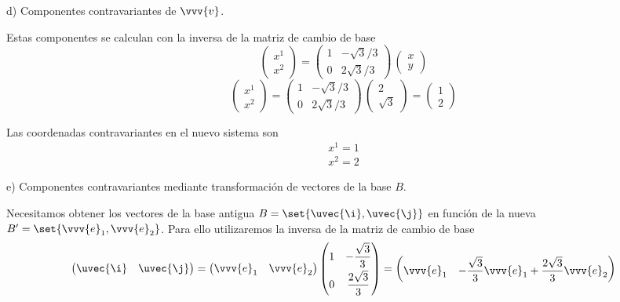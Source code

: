 \noindent
d) Componentes contravariantes de $\vvv{v}$.

Estas componentes se calculan con la inversa de la matriz de cambio de base
\[
  \begin{pmatrix}
    x^1\\
    x^2
  \end{pmatrix}
  = \begin{pmatrix}
    1 & -\sqrt{3}/3\\
    0 & 2\sqrt{3}/3
  \end{pmatrix}
  \,\begin{pmatrix}
    x\\
    y
  \end{pmatrix}
\]
\[
  \begin{pmatrix}
    x^1\\
    x^2
  \end{pmatrix}
  = \begin{pmatrix}
    1 & -\sqrt{3}/3\\
    0 & 2\sqrt{3}/3
  \end{pmatrix}
  \,\begin{pmatrix}
    2\\[0.4ex]
    \sqrt{3}
  \end{pmatrix}
  = \begin{pmatrix}
    1\\
    2
  \end{pmatrix}
\]

Las coordenadas contravariantes en el nuevo sistema son
\begin{align*}
  x^1 = 1\\
  x^2 = 2
\end{align*}

\noindent
e) Componentes contravariantes mediante transformación de vectores de la base $B$.

Necesitamos obtener los vectores de la base antigua $B=\set{\uvec{\i},\uvec{\j}}$ en
función de la nueva $B'=\set{\vvv{e}_1,\vvv{e}_2}$. Para ello utilizaremos la inversa de
la matriz de cambio de base
\[
  \begin{pmatrix}
    \uvec{\i} & \uvec{\j}
  \end{pmatrix}
  =
  \begin{pmatrix}
    \vvv{e}_1 & \vvv{e}_2
  \end{pmatrix}
  \begin{pmatrix}
    1 & -\dfrac{\sqrt{3}}{3}\\[1.4ex]
    0 & \dfrac{2\sqrt{3}}{3}
  \end{pmatrix}
  =
  \begin{pmatrix}
    \vvv{e}_1 & -\dfrac{\sqrt{3}}{3}\vvv{e}_1+\dfrac{2\sqrt{3}}{3}\vvv{e}_2
  \end{pmatrix}
\]


